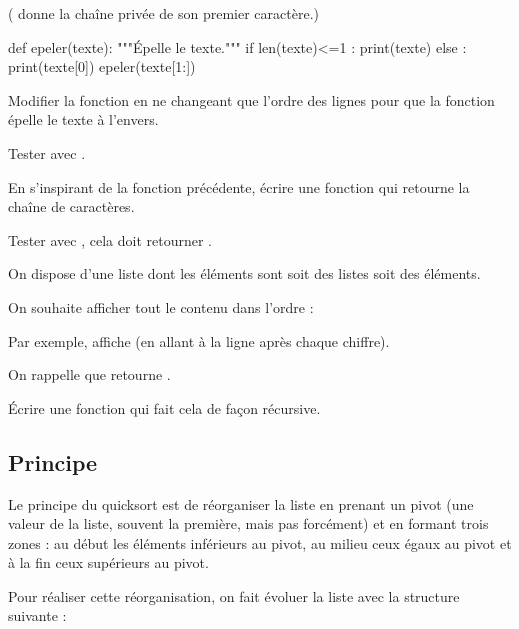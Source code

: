 \documentclass[french,12pt,twoside]{VcCours}
\begin{document}
( donne la chaîne privée de son premier caractère.)
\begin{Python}
def epeler(texte):
    """Épelle le texte."""
    if len(texte)<=1 :
        print(texte) 
    else :
        print(texte[0])
        epeler(texte[1:]) 
\end{Python}


\begin{Exercice}
Modifier la fonction en ne changeant que l'ordre des lignes pour que la fonction
épelle le texte à l'envers.

Tester avec .
\end{Exercice}

\begin{Exercice}
  En s'inspirant de la fonction précédente, écrire une fonction 
   qui retourne la chaîne de caractères.
  
  Tester avec , cela doit retourner .
\end{Exercice}

\begin{Exercice}
  On dispose d'une liste dont les éléments sont soit des listes soit des éléments.
  
  On souhaite afficher tout le contenu dans l'ordre :

  Par exemple,  affiche 
  (en allant à la ligne après chaque chiffre).
  
  On rappelle que  retourne .
  
  Écrire une fonction  qui fait cela de façon récursive.
\end{Exercice}
  

\newpage
\subsection{Principe}
Le principe du quicksort est de réorganiser la liste en prenant un pivot (une 
valeur de la liste, souvent la première, mais pas forcément) et en formant trois 
zones : au début les éléments inférieurs au pivot, au milieu ceux égaux au pivot 
et à la fin ceux supérieurs au pivot.

Pour réaliser cette réorganisation, on fait évoluer la liste avec la structure 
suivante :

\medskip
  \begin{center}
  \end{center}
  
\end{document}
